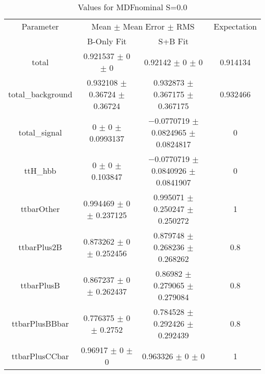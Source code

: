 \begin{table}
\centering
\caption{Values for MDFnominal S=0.0}
\begin{tabular}{cccc}
\toprule
Parameter & \multicolumn{2}{c}{Mean $\pm$ Mean Error $\pm$ RMS} & Expectation\\
 & B-Only Fit & S+B Fit & \\
\midrule
total & \num{0.921537} $\pm$ \num{0} $\pm$ \num{0} & \num{0.92142} $\pm$ \num{0} $\pm$ \num{0} & \num{0.914134}\\
total\_background & \num{0.932108} $\pm$ \num{0.36724} $\pm$ \num{0.36724} & \num{0.932873} $\pm$ \num{0.367175} $\pm$ \num{0.367175} & \num{0.932466}\\
total\_signal & \num{0} $\pm$ \num{0} $\pm$ \num{0.0993137} & \num{-0.0770719} $\pm$ \num{0.0824965} $\pm$ \num{0.0824817} & \num{0}\\
ttH\_hbb & \num{0} $\pm$ \num{0} $\pm$ \num{0.103847} & \num{-0.0770719} $\pm$ \num{0.0840926} $\pm$ \num{0.0841907} & \num{0}\\
ttbarOther & \num{0.994469} $\pm$ \num{0} $\pm$ \num{0.237125} & \num{0.995071} $\pm$ \num{0.250247} $\pm$ \num{0.250272} & \num{1}\\
ttbarPlus2B & \num{0.873262} $\pm$ \num{0} $\pm$ \num{0.252456} & \num{0.879748} $\pm$ \num{0.268236} $\pm$ \num{0.268262} & \num{0.8}\\
ttbarPlusB & \num{0.867237} $\pm$ \num{0} $\pm$ \num{0.262437} & \num{0.86982} $\pm$ \num{0.279065} $\pm$ \num{0.279084} & \num{0.8}\\
ttbarPlusBBbar & \num{0.776375} $\pm$ \num{0} $\pm$ \num{0.2752} & \num{0.784528} $\pm$ \num{0.292426} $\pm$ \num{0.292439} & \num{0.8}\\
ttbarPlusCCbar & \num{0.96917} $\pm$ \num{0} $\pm$ \num{0} & \num{0.963326} $\pm$ \num{0} $\pm$ \num{0} & \num{1}\\
\bottomrule
\end{tabular}
\end{table}